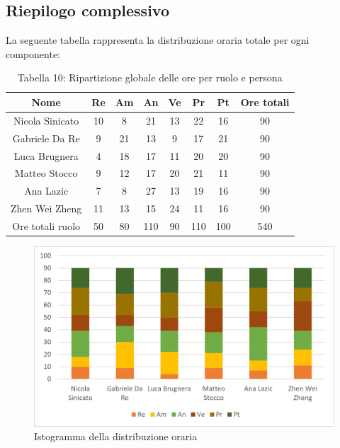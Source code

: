 \subsection{Riepilogo complessivo}
%
La seguente tabella rappresenta la distribuzione oraria totale per ogni componente:
\begin{table}[h]
	\setlength\extrarowheight{5pt}
	\centering
	\begin{tabularx}{\textwidth}{|ccccccc|c|}
		\hline
		\rowcolor{white}
		\textbf{Nome} & \textbf{Re} & \textbf{Am} & \textbf{An} & \textbf{Ve} & \textbf{Pr}& \textbf{Pt} & \textbf{Ore totali} \\
		\hline
		Nicola Sinicato &10&8&21&13&22&16&90 \\
		Gabriele Da Re &9&21&13&9&17&21&90 \\
		Luca Brugnera &4&18&17&11&20&20&90 \\
		Matteo Stocco &9&12&17&20&21&11&90 \\
		Ana Lazic &7&8&27&13&19&16&90 \\
		Zhen Wei Zheng &11&13&15&24&11&16&90 \\
		\hline
		Ore totali ruolo &50&80&110&90&110&100&540 \\
		\hline
	\end{tabularx}
	\vspace{10pt}
	\caption{Tabella 10: Ripartizione globale delle ore per ruolo e persona}
\end{table}
\begin{figure}[H]
    \centering
    \includegraphics[scale=0.6]{img/grafi preventivo/istogrammi/totale/totale.png}
    \caption{Istogramma della distribuzione oraria}
\end{figure}
